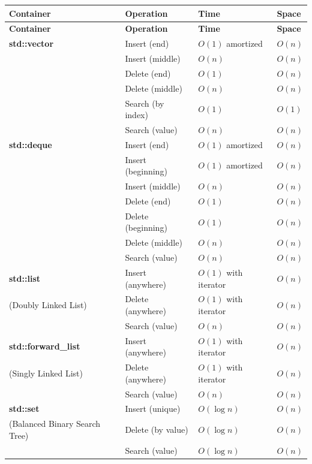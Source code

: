\documentclass[../main]{subfiles}
\begin{document}
\fontsize{10.3}{13}\selectfont
\begin{longtable}{|l|l|l|l|}
\hline
\textbf{Container} & \textbf{Operation} & \textbf{Time} & \textbf{Space} \\
\hline
\endfirsthead
\hline
\textbf{Container} & \textbf{Operation} & \textbf{Time} & \textbf{Space} \\
\hline
\endhead
\hline
\endfoot
\hline

\textbf{std::vector} & Insert (end) & $O(1)$ amortized & $O(n)$ \\
 & Insert (middle) & $O(n)$ & $O(n)$ \\
 & Delete (end) & $O(1)$ & $O(n)$ \\
 & Delete (middle) & $O(n)$ & $O(n)$ \\
 & Search (by index) & $O(1)$ & $O(1)$ \\
 & Search (value) & $O(n)$ & $O(n)$ \\
\hline

\textbf{std::deque} & Insert (end) & $O(1)$ amortized & $O(n)$ \\
 & Insert (beginning) & $O(1)$ amortized & $O(n)$ \\
 & Insert (middle) & $O(n)$ & $O(n)$ \\
 & Delete (end) & $O(1)$ & $O(n)$ \\
 & Delete (beginning) & $O(1)$ & $O(n)$ \\
 & Delete (middle) & $O(n)$ & $O(n)$ \\
 & Search (value) & $O(n)$ & $O(n)$ \\
\hline

\textbf{std::list} & Insert (anywhere) & $O(1)$ with iterator & $O(n)$ \\
(Doubly Linked List) & Delete (anywhere) & $O(1)$ with iterator & $O(n)$ \\
 & Search (value) & $O(n)$ & $O(n)$ \\
\hline

\textbf{std::forward\_list}& Insert (anywhere) & $O(1)$ with iterator & $O(n)$ \\
(Singly Linked List) & Delete (anywhere) & $O(1)$ with iterator & $O(n)$ \\
 & Search (value) & $O(n)$ & $O(n)$ \\
\hline

\textbf{std::set} & Insert (unique) & $O(\log n)$ & $O(n)$ \\
(Balanced Binary Search Tree) & Delete (by value) & $O(\log n)$ & $O(n)$ \\
 & Search (value) & $O(\log n)$ & $O(n)$ \\
\hline


\end{longtable}
\end{document}
